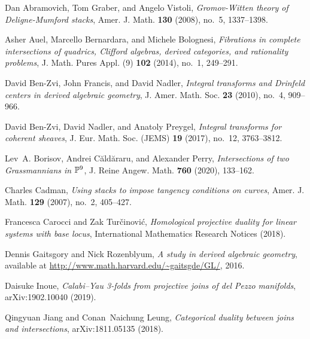 \documentclass[11pt, reqno]{amsart}
\numberwithin{equation}{section}
\theoremstyle{plain}
\theoremstyle{definition}
\begin{document}
\providecommand{\bysame}{\leavevmode\hbox to3em{\hrulefill}\thinspace}
\providecommand{\MR}{\relax\ifhmode\unskip\space\fi MR }
\providecommand{\MRhref}[2]{%
  \href{http://www.ams.org/mathscinet-getitem?mr=#1}{#2}
}
\providecommand{\href}[2]{#2}
\begin{thebibliography}{10}

Dan Abramovich, Tom Graber, and Angelo Vistoli, \emph{Gromov-{W}itten theory of
  {D}eligne-{M}umford stacks}, Amer. J. Math. \textbf{130} (2008), no.~5,
  1337--1398.

Asher Auel, Marcello Bernardara, and Michele Bolognesi, \emph{Fibrations in
  complete intersections of quadrics, {C}lifford algebras, derived categories,
  and rationality problems}, J. Math. Pures Appl. (9) \textbf{102} (2014),
  no.~1, 249--291.

David Ben-Zvi, John Francis, and David Nadler, \emph{Integral transforms and
  {D}rinfeld centers in derived algebraic geometry}, J. Amer. Math. Soc.
  \textbf{23} (2010), no.~4, 909--966.

David Ben-Zvi, David Nadler, and Anatoly Preygel, \emph{Integral transforms for
  coherent sheaves}, J. Eur. Math. Soc. (JEMS) \textbf{19} (2017), no.~12,
  3763--3812.

Lev~A. Borisov, Andrei C\u{a}ld\u{a}raru, and Alexander Perry,
  \emph{Intersections of two {G}rassmannians in {$\Bbb{P}^9$}}, J. Reine Angew.
  Math. \textbf{760} (2020), 133--162.

Charles Cadman, \emph{Using stacks to impose tangency conditions on curves},
  Amer. J. Math. \textbf{129} (2007), no.~2, 405--427.

Francesca Carocci and Zak Tur\v{c}inovi\'{c}, \emph{Homological projective
  duality for linear systems with base locus}, International Mathematics
  Research Notices (2018).

Dennis Gaitsgory and Nick Rozenblyum, \emph{A study in derived algebraic
  geometry}, available at \url{http://www.math.harvard.edu/~gaitsgde/GL/},
  2016.

Daisuke Inoue, \emph{Calabi--{Y}au 3-folds from projective joins of del {P}ezzo
  manifolds}, arXiv:1902.10040 (2019).

Qingyuan Jiang and Conan~Naichung Leung, \emph{Categorical duality between
  joins and intersections}, arXiv:1811.05135 (2018).


\end{thebibliography}
\end{document}
